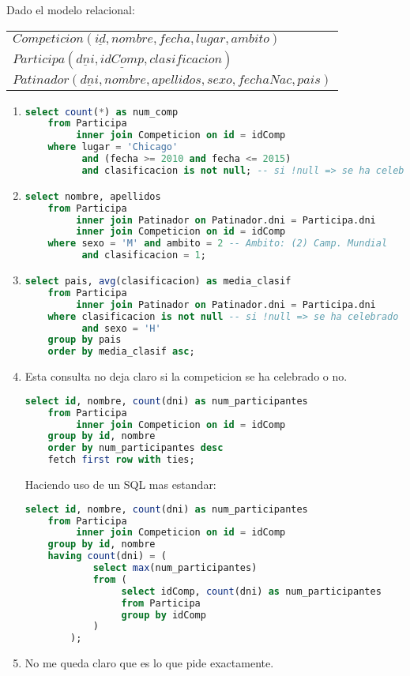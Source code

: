 Dado el modelo relacional:
\begin{center}
	\begin{tabular}{l}
		$Competicion(\underline{id}, nombre, fecha, lugar, ambito)$\\
		$Participa(\underline{dni}, \underline{idComp}, clasificacion)$\\
		$Patinador(\underline{dni}, nombre, apellidos, sexo, fechaNac, pais)$\\
	\end{tabular}
\end{center}

\begin{enumerate}
	\item \begin{lstlisting}[language=sql]
	select count(*) as num_comp
	from Participa
		 inner join Competicion on id = idComp
	where lugar = 'Chicago'
		  and (fecha >= 2010 and fecha <= 2015)
		  and clasificacion is not null; -- si !null => se ha celebrado\end{lstlisting}
		  
	\item \begin{lstlisting}[language=sql]
	select nombre, apellidos
	from Participa
		 inner join Patinador on Patinador.dni = Participa.dni
		 inner join Competicion on id = idComp
	where sexo = 'M' and ambito = 2 -- Ambito: (2) Camp. Mundial
		  and clasificacion = 1;\end{lstlisting}
		  
	\item  \begin{lstlisting}[language=sql]
	select pais, avg(clasificacion) as media_clasif
	from Participa
		 inner join Patinador on Patinador.dni = Participa.dni
	where clasificacion is not null -- si !null => se ha celebrado
		  and sexo = 'H'
	group by pais
	order by media_clasif asc;\end{lstlisting}
	
	\item Esta consulta no deja claro si la competicion se ha celebrado o no.\begin{lstlisting}[language=sql]
	select id, nombre, count(dni) as num_participantes
	from Participa
		 inner join Competicion on id = idComp
	group by id, nombre
	order by num_participantes desc
	fetch first row with ties;\end{lstlisting}
	
	Haciendo uso de un SQL mas estandar:
	
	\begin{lstlisting}[language=sql]
	select id, nombre, count(dni) as num_participantes
	from Participa
		 inner join Competicion on id = idComp
	group by id, nombre
	having count(dni) = (
			select max(num_participantes)
			from (
				 select idComp, count(dni) as num_participantes 
				 from Participa
				 group by idComp
			)
		);\end{lstlisting}
		
	\item No me queda claro que es lo que pide exactamente.
\end{enumerate}